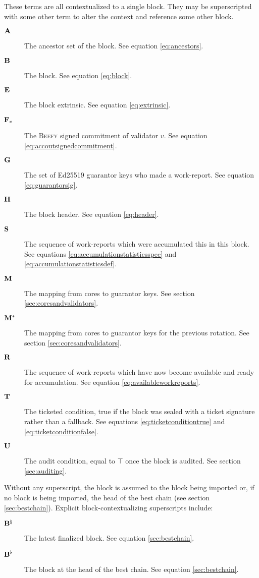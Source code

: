 These terms are all contextualized to a single block. They may be superscripted with some other term to alter the context and reference some other block.
\begin{description}
  \item[$\mathbf{A}$] The ancestor set of the block. See equation \ref{eq:ancestors}.
  \item[$\mathbf{B}$] The block. See equation \ref{eq:block}.
  \item[$\mathbf{E}$] The block extrinsic. See equation \ref{eq:extrinsic}.
  \item[$\mathbf{F}_{v}$] The \textsc{Beefy} signed commitment of validator $v$. See equation \ref{eq:accoutsignedcommitment}.
  \item[$\mathbf{G}$] The set of Ed25519 guarantor keys who made a work-report. See equation \ref{eq:guarantorsig}.
  \item[$\mathbf{H}$] The block header. See equation \ref{eq:header}.
  \item[$\mathbf{S}$] The sequence of work-reports which were accumulated this in this block. See equations \ref{eq:accumulationstatisticsspec} and \ref{eq:accumulationstatisticsdef}.
  \item[$\mathbf{M}$] The mapping from cores to guarantor keys. See section \ref{sec:coresandvalidators}.
  \item[$\mathbf{M}^*$] The mapping from cores to guarantor keys for the previous rotation. See section \ref{sec:coresandvalidators}.
  \item[$\mathbf{R}$] The sequence of work-reports which have now become available and ready for accumulation. See equation \ref{eq:availableworkreports}.
  \item[$\mathbf{T}$] The ticketed condition, true if the block was sealed with a ticket signature rather than a fallback. See equations \ref{eq:ticketconditiontrue} and \ref{eq:ticketconditionfalse}.
  \item[$\mathbf{U}$] The audit condition, equal to $\top$ once the block is audited. See section \ref{sec:auditing}.
\end{description}

Without any superscript, the block is assumed to the block being imported or, if no block is being imported, the head of the best chain (see section \ref{sec:bestchain}). Explicit block-contextualizing superscripts include:
\begin{description}
  \item[$\mathbf{B}^\natural$] The latest finalized block. See equation \ref{sec:bestchain}.
  \item[$\mathbf{B}^\flat$] The block at the head of the best chain. See equation \ref{sec:bestchain}.
\end{description}

